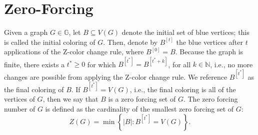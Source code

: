 \documentclass{article}
\theoremstyle{definition}
\newcommand\abs[1]{\left|#1\right|}
\begin{document}
\section{Zero-Forcing}\label{sec:zf}
Given a  graph $G\in\mathbb{G}$, let $B\subseteq V(G)$ denote the initial set of blue vertices; this is called the initial coloring of $G$.
Then, denote by $B^{[t]}$ the blue vertices after $t$ applications of the Z-color change rule, where $B^{[0]}=B$.
Because the graph is finite, there exists a $t^{*}\geq 0$ for which $B^{[t^{*}]} = B^{[t^{*}+k]}$, for all $k\in\mathbb{N}$, i.e., no more changes are possible from applying the Z-color change rule. 
We reference $B^{[t^{*}]}$ as the final coloring of $B$.
If $B^{[t^{*}]} = V(G)$, i.e., the final coloring is all of the vertices of $G$, then we say that $B$ is a zero forcing set of $G$.
The zero forcing number of $G$ is defined as the cardinality of the smallest zero forcing set of $G$:
\[
Z(G) = \min\left\{\abs{B}\colon B^{[t^{*}]} = V(G)\right\}.
\]
\end{document}
